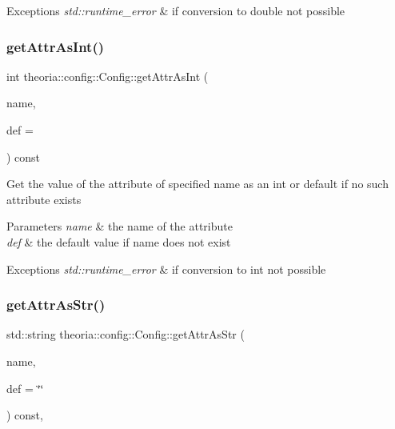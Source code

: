 \begin{DoxyExceptions}{Exceptions}
{\em std\+::runtime\+\_\+error} & if conversion to double not possible \\
\hline
\end{DoxyExceptions}
\mbox{\label{classtheoria_1_1config_1_1Config_a991d0271d01d4f77f25a980399e88a60}} 
\subsubsection{\texorpdfstring{get\+Attr\+As\+Int()}{getAttrAsInt()}}
{\footnotesize\ttfamily int theoria\+::config\+::\+Config\+::get\+Attr\+As\+Int (\begin{DoxyParamCaption}\item[{const std\+::string \&}]{name,  }\item[{int}]{def = {} }\end{DoxyParamCaption}) const\hspace{0.3cm}{\ttfamily [inline]}}

Get the value of the attribute of specified name as an int or default if no such attribute exists 
\begin{DoxyParams}{Parameters}
{\em name} & the name of the attribute \\
\hline
{\em def} & the default value if name does not exist \\
\hline
\end{DoxyParams}

\begin{DoxyExceptions}{Exceptions}
{\em std\+::runtime\+\_\+error} & if conversion to int not possible \\
\hline
\end{DoxyExceptions}
\mbox{\label{classtheoria_1_1config_1_1Config_a45702e009219115ee14b11ad1f0a851a}} 
\subsubsection{\texorpdfstring{get\+Attr\+As\+Str()}{getAttrAsStr()}}
{\footnotesize\ttfamily std\+::string theoria\+::config\+::\+Config\+::get\+Attr\+As\+Str (\begin{DoxyParamCaption}\item[{const std\+::string \&}]{name,  }\item[{const std\+::string \&}]{def = {\ttfamily \char`\"{}\char`\"{}} }\end{DoxyParamCaption}) const\hspace{0.3cm}{\ttfamily [inline]}, {\ttfamily [noexcept]}}

